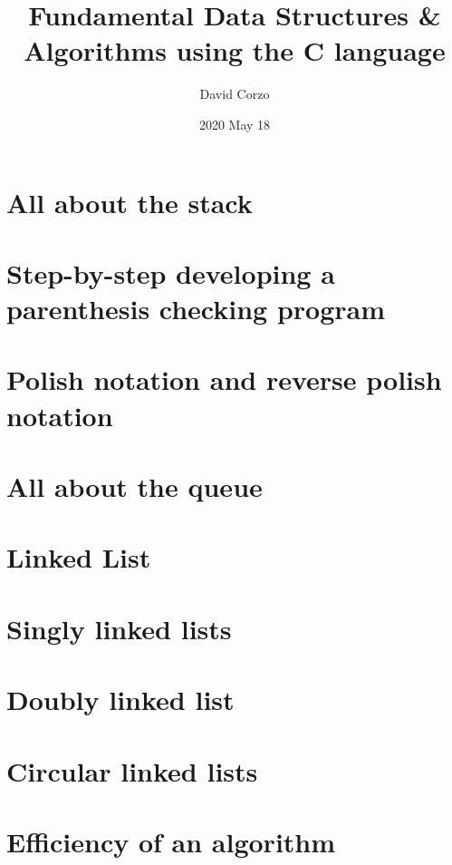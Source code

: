 \documentclass[openany]{book}
\title{\Huge Fundamental Data Structures \& Algorithms using the C language}
\date{2020 May 18} %
\author{David Corzo}
\begin{document}
\maketitle 
\tableofcontents

\chapter{All about the stack}


\chapter{Step-by-step developing a parenthesis checking program}


\chapter{Polish notation and reverse polish notation}


\chapter{All about the queue}


\chapter{Linked List}


\chapter{Singly linked lists}


\chapter{Doubly linked list}


\chapter{Circular linked lists}


\chapter{Efficiency of an algorithm}

\end{document}
